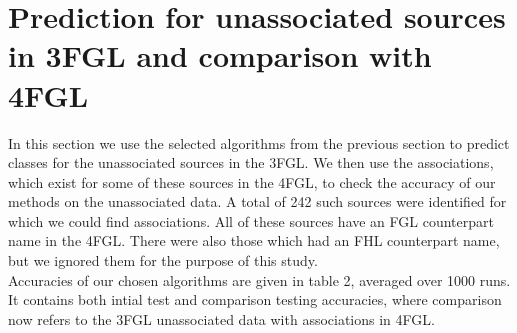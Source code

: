 \section{Prediction for unassociated sources in 3FGL and comparison with 4FGL}


In this section we use the selected algorithms from the previous section to predict classes for the unassociated sources in the 3FGL. 
We then use the associations, which exist for some of these sources in the 4FGL, to check the accuracy of our methods on the unassociated data.  A total of 242 such sources were identified for which we could find associations. All of these sources have an FGL counterpart name in the 4FGL. There were also those which had an FHL counterpart name, but we ignored them for the purpose of this study.\\

Accuracies of our chosen algorithms are given in table 2, averaged over 1000 runs. It contains both intial test and comparison testing accuracies, where comparison now refers to the 3FGL unassociated data with associations in 4FGL. 


\begin{table}[!h]

    \vspace{0.2cm}
    \caption{Accuracy of the 4 selected algorithms on 3FGL unassociated data.}
    \label{tab:selected_algs}
\end{table}

